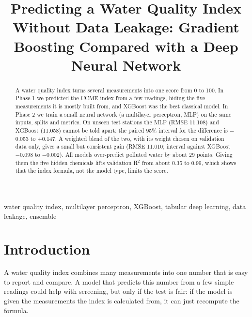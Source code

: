 \documentclass[conference]{IEEEtran}
\begin{document}
\title{Predicting a Water Quality Index Without Data Leakage: Gradient Boosting Compared with a Deep Neural Network}
\author{
}
\maketitle
\begin{abstract}
A water quality index turns several measurements into one score from 0 to 100. In Phase 1 we predicted the CCME index from a few readings, hiding the five measurements it is mostly built from, and XGBoost was the best classical model. In Phase 2 we train a small neural network (a multilayer perceptron, MLP) on the same inputs, splits and metrics. On unseen test stations the MLP (RMSE 11.108) and XGBoost (11.058) cannot be told apart: the paired 95\% interval for the difference is $-$0.053 to $+$0.147. A weighted blend of the two, with its weight chosen on validation data only, gives a small but consistent gain (RMSE 11.010; interval against XGBoost $-$0.098 to $-$0.002). All models over-predict polluted water by about 29 points. Giving them the five hidden chemicals lifts validation R$^2$ from about 0.35 to 0.99, which shows that the index formula, not the model type, limits the score.
\end{abstract}
\begin{IEEEkeywords}
water quality index, multilayer perceptron, XGBoost, tabular deep learning, data leakage, ensemble
\end{IEEEkeywords}

\section{Introduction}
A water quality index combines many measurements into one number that is easy to report and compare. A model that predicts this number from a few simple readings could help with screening, but only if the test is fair: if the model is given the measurements the index is calculated from, it can just recompute the formula.
\end{document}
